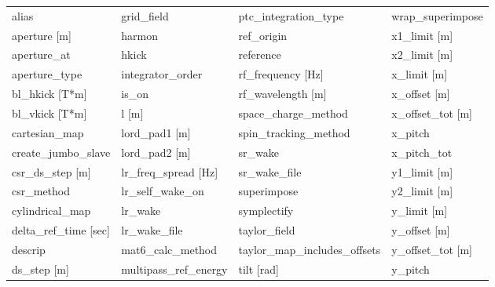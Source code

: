  \begin{tabular}{llll} \toprule
alias                            & grid_field                       & ptc_integration_type             & wrap_superimpose                 \\
aperture [m]                     & harmon                           & ref_origin                       & x1_limit [m]                     \\
aperture_at                      & hkick                            & reference                        & x2_limit [m]                     \\
aperture_type                    & integrator_order                 & rf_frequency [Hz]                & x_limit [m]                      \\
bl_hkick [T*m]                   & is_on                            & rf_wavelength [m]                & x_offset [m]                     \\
bl_vkick [T*m]                   & l [m]                            & space_charge_method              & x_offset_tot [m]                 \\
cartesian_map                    & lord_pad1 [m]                    & spin_tracking_method             & x_pitch                          \\
create_jumbo_slave               & lord_pad2 [m]                    & sr_wake                          & x_pitch_tot                      \\
csr_ds_step [m]                  & lr_freq_spread [Hz]              & sr_wake_file                     & y1_limit [m]                     \\
csr_method                       & lr_self_wake_on                  & superimpose                      & y2_limit [m]                     \\
cylindrical_map                  & lr_wake                          & symplectify                      & y_limit [m]                      \\
delta_ref_time [sec]             & lr_wake_file                     & taylor_field                     & y_offset [m]                     \\
descrip                          & mat6_calc_method                 & taylor_map_includes_offsets      & y_offset_tot [m]                 \\
ds_step [m]                      & multipass_ref_energy             & tilt [rad]                       & y_pitch                          \\

\end{tabular}
